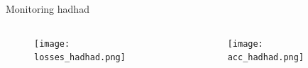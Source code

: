   
\begin{frame}{Monitoring hadhad}
\begin{columns}
  \begin{column}{0.5\textwidth}
    \begin{figure}
      \texttt{[image: losses\_hadhad.png]}
    \end{figure}
  \end{column}
  \begin{column}{0.5\textwidth}
    \begin{figure}
      \texttt{[image: acc\_hadhad.png]}
    \end{figure}
  \end{column}
\end{columns}
\end{frame}

